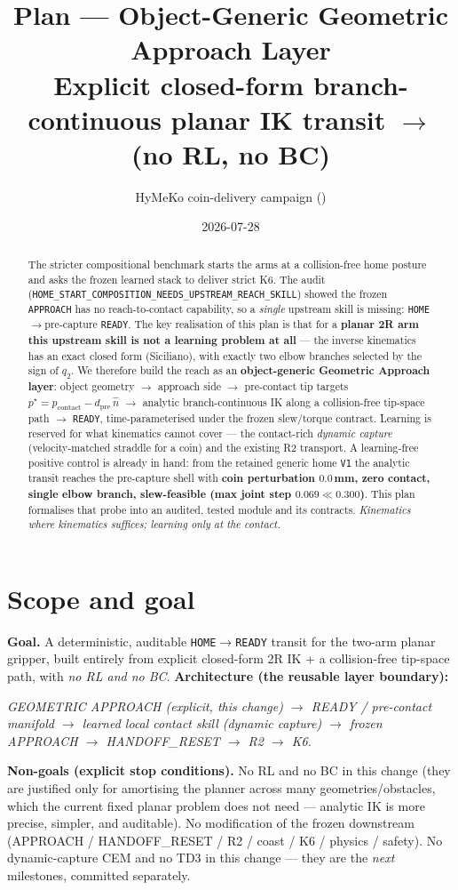 \documentclass[11pt]{article}
\title{\textbf{Plan --- Object-Generic Geometric Approach Layer}\\[2pt]
\large Explicit closed-form branch-continuous planar IK transit \code{HOME}$\rightarrow$\code{READY} (no RL, no BC)}
\author{HyMeKo coin-delivery campaign \quad(\code{recovery/coin-r9-causal-residual-delivery})}
\date{2026-07-28}
\newcommand{\code}[1]{\texttt{\small #1}}
\begin{document}
\maketitle

\begin{abstract}
\noindent The stricter compositional benchmark starts the arms at a collision-free home posture and asks the frozen
learned stack to deliver strict K6. The audit (\code{HOME\_START\_COMPOSITION\_NEEDS\_UPSTREAM\_REACH\_SKILL}) showed the
frozen \code{APPROACH} has no reach-to-contact capability, so a \emph{single} upstream skill is missing:
\code{HOME}$\rightarrow$pre-capture \code{READY}. The key realisation of this plan is that for a \textbf{planar 2R arm this
upstream skill is not a learning problem at all} --- the inverse kinematics has an exact closed form (Siciliano), with
exactly two elbow branches selected by the sign of $q_2$. We therefore build the reach as an \textbf{object-generic
Geometric Approach layer}: object geometry $\rightarrow$ approach side $\rightarrow$ pre-contact tip targets
$p^\star=p_{\text{contact}}-d_{\text{pre}}\,\hat n$ $\rightarrow$ analytic branch-continuous IK along a collision-free
tip-space path $\rightarrow$ \code{READY}, time-parameterised under the frozen slew/torque contract. Learning is reserved
for what kinematics cannot cover --- the contact-rich \emph{dynamic capture} (velocity-matched straddle for a coin) and
the existing R2 transport. A learning-free positive control is already in hand: from the retained generic home
\code{V1} the analytic transit reaches the pre-capture shell with \textbf{coin perturbation $0.0$\,mm, zero contact,
single elbow branch, slew-feasible (max joint step $0.069\ll0.300$)}. This plan formalises that probe into an audited,
tested module and its contracts. \emph{Kinematics where kinematics suffices; learning only at the contact.}
\end{abstract}

\section{Scope and goal}
\textbf{Goal.} A deterministic, auditable \code{HOME}$\rightarrow$\code{READY} transit for the two-arm planar gripper,
built entirely from explicit closed-form 2R IK + a collision-free tip-space path, with \emph{no RL and no BC}.
\textbf{Architecture (the reusable layer boundary):}
\begin{center}\itshape GEOMETRIC APPROACH (explicit, this change) $\rightarrow$ READY / pre-contact manifold
$\rightarrow$ learned local contact skill (dynamic capture) $\rightarrow$ frozen APPROACH $\rightarrow$ HANDOFF\_RESET
$\rightarrow$ R2 $\rightarrow$ K6.\end{center}
\textbf{Non-goals (explicit stop conditions).} No RL and no BC in this change (they are justified only for amortising the
planner across many geometries/obstacles, which the current fixed planar problem does not need --- analytic IK is more
precise, simpler, and auditable). No modification of the frozen downstream (APPROACH / HANDOFF\_RESET / R2 / coast / K6
/ physics / safety). No dynamic-capture CEM and no TD3 in this change --- they are the \emph{next} milestones, committed
separately.
\end{document}
